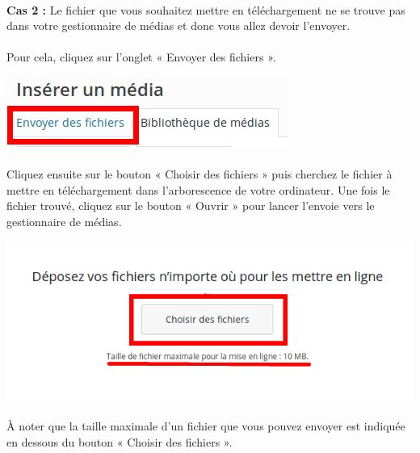\documentclass[10pt,a4paper]{article}
\begin{document}
\paragraph{}\textbf{Cas 2 : }Le fichier que vous souhaitez mettre en téléchargement ne se trouve pas dans votre gestionnaire de médias et donc vous allez devoir l'envoyer.
\paragraph{}Pour cela, cliquez sur l'onglet « Envoyer des fichiers ».
\begin{center}
\includegraphics[scale=0.35]{img/0083.png}
\end{center}
\paragraph{}Cliquez ensuite sur le bouton « Choisir des fichiers » puis cherchez le fichier à mettre en téléchargement dans l'arborescence de votre ordinateur. Une fois le fichier trouvé, cliquez sur le bouton « Ouvrir » pour lancer l'envoie vers le gestionnaire de médias.
\begin{center}
\includegraphics[scale=0.35]{img/0084.png}
\end{center}
\paragraph{}À noter que la taille maximale d'un fichier que vous pouvez envoyer est indiquée en dessous du bouton « Choisir des fichiers ».
\end{document}
